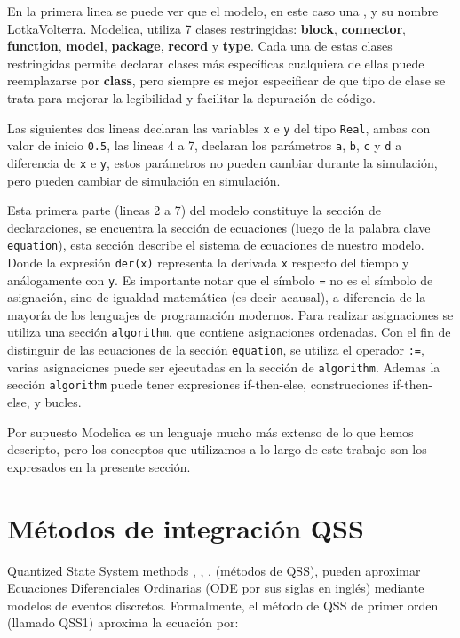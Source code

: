 	En la primera linea se puede ver que el modelo, en este caso una , y su nombre LotkaVolterra.
	Modelica, utiliza 7 clases restringidas:
	\textbf{block}, \textbf{connector}, \textbf{function}, \textbf{model}, \textbf{package}, \textbf{record} y \textbf{type}.
	Cada una de estas clases restringidas permite declarar clases más específicas cualquiera de ellas puede reemplazarse
	por \textbf{class}, pero siempre es mejor especificar de que tipo de clase se trata para mejorar la legibilidad y facilitar la depuración de código.

	Las siguientes dos lineas declaran las variables \texttt{x} e \texttt{y} del tipo \texttt{Real}, ambas con valor de inicio \texttt{0.5}, las lineas 4 a 7, 
	declaran los parámetros \texttt{a}, \texttt{b}, \texttt{c} y \texttt{d} a diferencia de \texttt{x} e \texttt{y}, estos parámetros no pueden cambiar durante la 
	simulación, pero pueden cambiar de simulación en simulación.

	Esta primera parte (lineas 2 a 7) del modelo constituye la sección de declaraciones, se encuentra la sección de ecuaciones (luego de la palabra clave 
	\texttt{equation}), esta sección describe el sistema de ecuaciones de nuestro modelo. Donde la expresión \texttt{der(x)} representa la derivada \texttt{x} 
	respecto del tiempo y análogamente con \texttt{y}.
	Es importante notar que el símbolo \texttt{=} no es el símbolo de asignación, sino de igualdad matemática (es decir acausal), a diferencia de la mayoría 
	de  los lenguajes de programación modernos.  Para realizar asignaciones se utiliza una sección \texttt{algorithm}, que contiene asignaciones ordenadas. 
	Con el fin de distinguir de las ecuaciones de la sección \texttt{equation}, se utiliza el operador \texttt{:=}, 
	varias asignaciones puede ser ejecutadas en la sección de \texttt{algorithm}. Ademas la sección \texttt{algorithm} puede tener expresiones if-then-else, 
	construcciones if-then-else, y bucles.

	Por supuesto Modelica es un lenguaje mucho más extenso de lo que hemos descripto, pero los conceptos que utilizamos a lo largo de este trabajo son los
	expresados en la presente sección.



\section{Métodos de integración QSS}
	Quantized State System methods \cite{Fer12}, \cite{Ber12}, \cite{Beltrame06quantisedstate}, \cite{Cel06} (métodos de QSS), pueden aproximar Ecuaciones Diferenciales Ordinarias (ODE por sus siglas en inglés) mediante modelos de 
	eventos discretos. Formalmente, el método de QSS de primer orden (llamado QSS1) aproxima la ecuación por:
	
